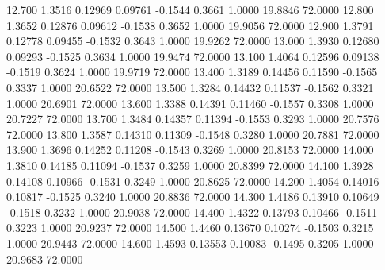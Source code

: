   12.700   1.3516   0.12969   0.09761  -0.1544   0.3661   1.0000  19.8846  72.0000
  12.800   1.3652   0.12876   0.09612  -0.1538   0.3652   1.0000  19.9056  72.0000
  12.900   1.3791   0.12778   0.09455  -0.1532   0.3643   1.0000  19.9262  72.0000
  13.000   1.3930   0.12680   0.09293  -0.1525   0.3634   1.0000  19.9474  72.0000
  13.100   1.4064   0.12596   0.09138  -0.1519   0.3624   1.0000  19.9719  72.0000
  13.400   1.3189   0.14456   0.11590  -0.1565   0.3337   1.0000  20.6522  72.0000
  13.500   1.3284   0.14432   0.11537  -0.1562   0.3321   1.0000  20.6901  72.0000
  13.600   1.3388   0.14391   0.11460  -0.1557   0.3308   1.0000  20.7227  72.0000
  13.700   1.3484   0.14357   0.11394  -0.1553   0.3293   1.0000  20.7576  72.0000
  13.800   1.3587   0.14310   0.11309  -0.1548   0.3280   1.0000  20.7881  72.0000
  13.900   1.3696   0.14252   0.11208  -0.1543   0.3269   1.0000  20.8153  72.0000
  14.000   1.3810   0.14185   0.11094  -0.1537   0.3259   1.0000  20.8399  72.0000
  14.100   1.3928   0.14108   0.10966  -0.1531   0.3249   1.0000  20.8625  72.0000
  14.200   1.4054   0.14016   0.10817  -0.1525   0.3240   1.0000  20.8836  72.0000
  14.300   1.4186   0.13910   0.10649  -0.1518   0.3232   1.0000  20.9038  72.0000
  14.400   1.4322   0.13793   0.10466  -0.1511   0.3223   1.0000  20.9237  72.0000
  14.500   1.4460   0.13670   0.10274  -0.1503   0.3215   1.0000  20.9443  72.0000
  14.600   1.4593   0.13553   0.10083  -0.1495   0.3205   1.0000  20.9683  72.0000
